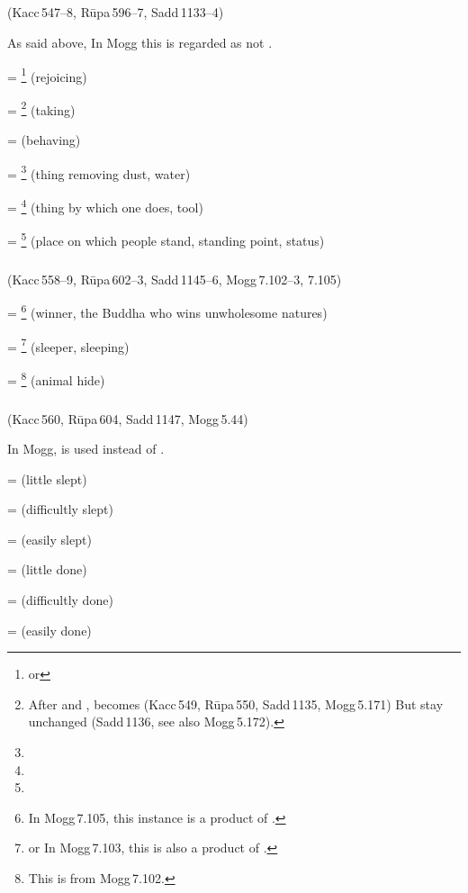 \subparagraph*{} (Kacc\,547--8, R\=upa\,596--7, Sadd\,1133--4)\label{pacck4:yu}

As said above, In Mogg this is regarded as  not .

 = \footnote{ or } (rejoicing)\par
{} = \footnote{After  and ,  becomes  (Kacc\,549, R\=upa\,550, Sadd\,1135, Mogg\,5.171) But  stay unchanged (Sadd\,1136, see also Mogg\,5.172).} (taking)\par
{} =  (behaving)\par
{} = \footnote{} (thing removing dust, water)\par
{} = \footnote{} (thing by which one does, tool)\par
{} = \footnote{} (place on which people stand, standing point, status)\par

\subparagraph*{} (Kacc\,558--9, R\=upa\,602--3, Sadd\,1145--6, Mogg\,7.102--3, 7.105)\label{pacck4:ina}\label{pacck4:naka}

 = \footnote{ In Mogg\,7.105, this instance is a product of .} (winner, the Buddha who wins unwholesome natures)\par
{} = \footnote{ or  In Mogg\,7.103, this is also a product of .} (sleeper, sleeping)\par
{} = \footnote{This is from Mogg\,7.102.} (animal hide)\par

\subparagraph*{} (Kacc\,560, R\=upa\,604, Sadd\,1147, Mogg\,5.44)\label{pacck4:kha}\label{pacck4:a}

In Mogg,  is used instead of .

 =  (little slept)\par
{} =  (difficultly slept)\par
{} =  (easily slept)\par
{} =  (little done)\par
{} =  (difficultly done)\par
{} =  (easily done)\par

